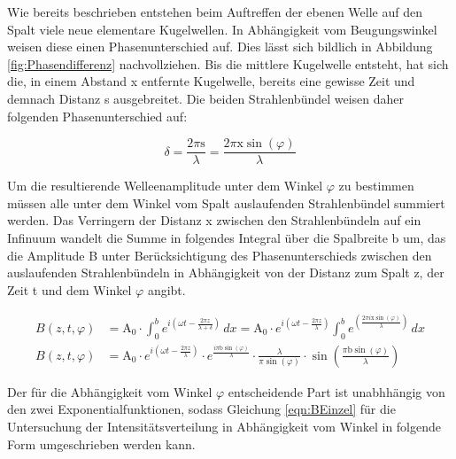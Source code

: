 \documentclass[titlepage = firstcover]{scrartcl}
\begin{document}
            \FloatBarrier

            \noindent

            Wie bereits beschrieben entstehen beim Auftreffen der ebenen Welle auf den Spalt viele neue elementare Kugelwellen. In Abhängigkeit vom Beugungswinkel weisen diese einen Phasenunterschied
            auf. Dies lässt sich bildlich in Abbildung \ref{fig:Phasendifferenz} nachvollziehen. Bis die mittlere Kugelwelle entsteht, hat sich die, in einem Abstand x entfernte Kugelwelle, bereits 
            eine gewisse Zeit und demnach Distanz s ausgebreitet. Die beiden Strahlenbündel weisen daher folgenden Phasenunterschied auf:

            \begin{equation}
                \delta = \frac{2\pi \text{s}}{\lambda} = \frac{2\pi \text{x} \sin(\varphi)}{\lambda}
                \label{eqn:Phasendiff}
            \end{equation}

            \noindent
            Um die resultierende Welleenamplitude unter dem Winkel $\varphi$ zu bestimmen müssen alle unter dem Winkel vom Spalt auslaufenden Strahlenbündel summiert werden. Das Verringern der 
            Distanz x zwischen den Strahlenbündeln auf ein Infinuum wandelt die Summe in folgendes Integral über die Spalbreite b um, das die Amplitude B unter Berücksichtigung des Phasenunterschieds 
            zwischen den auslaufenden Strahlenbündeln in Abhängigkeit von der Distanz zum Spalt z, der Zeit t und dem Winkel $\varphi$ angibt.

            \begin{align}
                B(z, t, \varphi) &= \text{A}_0 \cdot \int_0^b e^{i\left(\omega t - \frac{2 \pi z}{\lambda + \delta}\right)} \, dx = \text{A}_0 \cdot e^{i\left(\omega t - \frac{2 \pi z}{\lambda}\right)} \int_0^b e^{\left(\frac{2\pi i \text{x} \sin(\varphi)}{\lambda}\right)} \, dx \\
                B(z, t, \varphi) &= \text{A}_0 \cdot e^{i\left(\omega t - \frac{2 \pi z}{\lambda}\right)} \cdot e^{\frac{i \pi \text{b} \sin(\varphi)}{\lambda}} \cdot \frac{\lambda}{\pi \sin(\varphi)} \cdot \sin \left(\frac{\pi \text{b} \sin (\varphi)}{\lambda}\right)
                \label{eqn:BEinzel}
            \end{align}

            \noindent
            Der für die Abhängigkeit vom Winkel $\varphi$ entscheidende Part ist unabhhängig von den zwei Exponentialfunktionen, sodass Gleichung \ref{eqn:BEinzel} für die Untersuchung der 
            Intensitätsverteilung in Abhängigkeit vom Winkel in folgende Form umgeschrieben werden kann.
\end{document}
